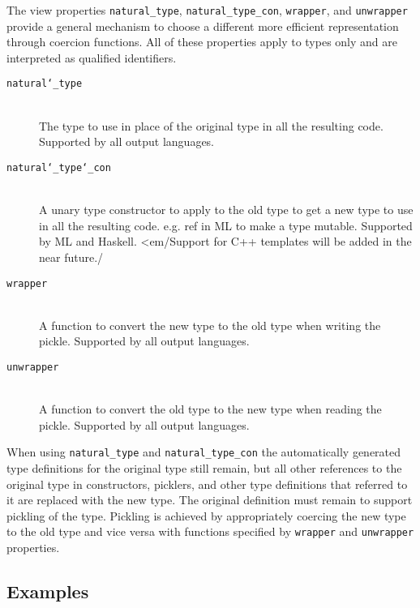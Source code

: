 The view properties \lstinline!natural_type!, \lstinline!natural_type_con!, \lstinline!wrapper!,
and \lstinline!unwrapper! provide a general mechanism to choose a different
more efficient representation through coercion functions. All of these
properties apply to types only and are interpreted as qualified identifiers.

\begin{description} 
  \item[\texttt{natural\char`\_type}] \mbox{} \\
    The type to use in place of the original type in all the resulting code. 
    Supported by all output languages.

  \item[\texttt{natural\char`\_type\char`\_con}] \mbox{} \\
    A unary type constructor to apply to the old type to get a new type to
    use in all the resulting code. e.g. ref in ML to make a type
    mutable. Supported by ML and Haskell.  <em/Support for C++ templates
    will be added in the near future./

  \item[\texttt{wrapper}] \mbox{} \\
    A function to convert the new type to the old type when writing the
    pickle. Supported by all output languages.

  \item[\texttt{unwrapper}] \mbox{} \\
    A function to convert the old type to the new type when reading the pickle. 
    Supported by all output languages. 
\end{description}%

When using \lstinline!natural_type! and \lstinline!natural_type_con! the automatically
generated type definitions for the original type still remain, but all other
references to the original type in constructors, picklers, and other type
definitions that referred to it are replaced with the new type. The original
definition must remain to support pickling of the type. Pickling is achieved
by appropriately coercing the new type to the old type and vice versa with
functions specified by \lstinline!wrapper! and \lstinline!unwrapper! properties.

\subsection{Examples}

